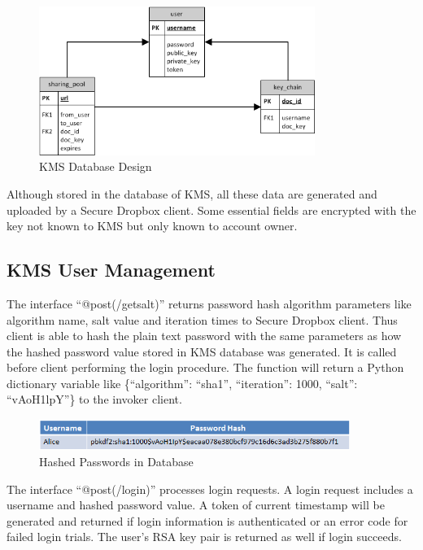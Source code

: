 \begin{figure}[h]
        \centering
        \includegraphics[width=0.8\textwidth]{figures/Database_Design.png}
        \caption[KMS Database Design] {KMS Database Design}
\end{figure}

Although stored in the database of KMS, all these data are generated and uploaded by a Secure Dropbox client. Some essential fields are encrypted with the key not known to KMS but only known to account owner.

\subsection{KMS User Management}

The interface ``@post(/getsalt)'' returns password hash algorithm parameters like algorithm name, salt value and iteration times to Secure Dropbox client. Thus client is able to hash the plain text password with the same parameters as how the hashed password value stored in KMS database was generated. It is called before client performing the login procedure. The function will return a Python dictionary variable like \{``algorithm'': ``sha1'', ``iteration'': 1000, ``salt'': ``vAoH1lpY''\} to the invoker client.

\begin{figure}[h]
        \centering
        \includegraphics[width=0.9\textwidth]{figures/Hashed_Passwords_in_Database.png}
        \caption[Hashed Passwords] {Hashed Passwords in Database}
\end{figure}

The interface ``@post(/login)'' processes login requests. A login request includes a username and hashed password value. A token of current timestamp will be generated and returned if login information is authenticated or an error code for failed login trials. The user’s RSA key pair is returned as well if login succeeds.


